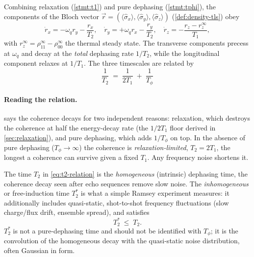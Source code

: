 \begin{statement}
\label{stmt:bloch-equations}
Combining relaxation (\cref{stmt:t1}) and pure dephasing
(\cref{stmt:tphi}), the components of the Bloch vector
$\vec r=(\langle\hat\sigma_x\rangle,\langle\hat\sigma_y\rangle,\langle\hat\sigma_z\rangle)$
(\cref{def:density-tls}) obey
\begin{equation}
\label{eq:bloch-equations}
\dot r_x = -\omega_q r_y - \frac{r_x}{T_2},\quad
\dot r_y = +\omega_q r_x - \frac{r_y}{T_2},\quad
\dot r_z = -\frac{r_z - r_z^\infty}{T_1},
\end{equation}
with $r_z^\infty=\rho_{11}^\infty-\rho_{00}^\infty$ the thermal
steady state. The transverse components precess at $\omega_q$ and
decay at the \emph{total} dephasing rate $1/T_2$, while the
longitudinal component relaxes at $1/T_1$. The three timescales are
related by
\begin{equation}
\label{eq:t2-relation}
\boxed{\;\frac{1}{T_2} \;=\; \frac{1}{2T_1} \;+\; \frac{1}{T_\phi}\;}
\end{equation}
\end{statement}

\paragraph{Reading the relation.}
 says the coherence decays for two independent
reasons: relaxation, which destroys the coherence at half the
energy-decay rate (the $1/2T_1$ floor derived in
\cref{sec:relaxation}), and pure dephasing, which adds $1/T_\phi$ on
top. In the absence of pure dephasing ($T_\phi\to\infty$) the
coherence is \emph{relaxation-limited}, $T_2=2T_1$, the longest a
coherence can survive given a fixed $T_1$. Any frequency noise
shortens it.

\begin{statement}
\label{stmt:t2star}
The time $T_2$ in \cref{eq:t2-relation} is the \emph{homogeneous}
(intrinsic) dephasing time, the coherence decay seen after
echo sequences remove slow noise. The \emph{inhomogeneous} or
free-induction time $T_2^*$ is what a simple Ramsey experiment
measures: it additionally includes quasi-static, shot-to-shot
frequency fluctuations (slow charge/flux drift, ensemble spread),
and satisfies
\begin{equation}
\label{eq:t2star-ineq}
T_2^* \;\leq\; T_2.
\end{equation}
$T_2^*$ is not a pure-dephasing time and should not be identified
with $T_\phi$; it is the convolution of the homogeneous decay with
the quasi-static noise distribution, often Gaussian in form.
\end{statement}

